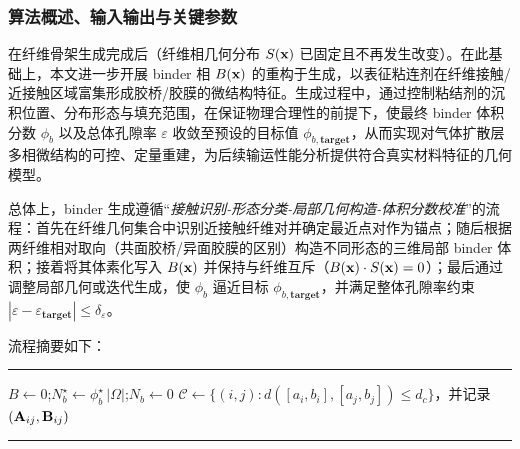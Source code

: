 \subsubsection{\textbf{算法概述、输入输出与关键参数}}

在纤维骨架生成完成后（纤维相几何分布 $S(\textbf x)$ 已固定且不再发生改变）。在此基础上，本文进一步开展 binder 相 $B(\textbf x)$ 的重构于生成，以表征粘连剂在纤维接触/近接触区域富集形成胶桥/胶膜的微结构特征。生成过程中，通过控制粘结剂的沉积位置、分布形态与填充范围，在保证物理合理性的前提下，使最终 binder 体积分数 $\phi_{b}$ 以及总体孔隙率 $\varepsilon$ 收敛至预设的目标值 $\phi_{b,\textbf{target}}$，从而实现对气体扩散层多相微结构的可控、定量重建，为后续输运性能分析提供符合真实材料特征的几何模型。

总体上，binder 生成遵循“\emph{接触识别-形态分类-局部几何构造-体积分数校准}”的流程：首先在纤维几何集合中识别近接触纤维对并确定最近点对作为锚点；随后根据两纤维相对取向（共面胶桥/异面胶膜的区别）构造不同形态的三维局部 binder 体积；接着将其体素化写入 $B(\textbf x)$ 并保持与纤维互斥（$B(\textbf x) \cdot S(\textbf x) = 0$）；最后通过调整局部几何或迭代生成，使 $\phi_{b}$ 逼近目标 $\phi_{b,\textbf{target}}$，并满足整体孔隙率约束 $|\varepsilon - \varepsilon_{\textbf{target}}| \le \delta_{\varepsilon}$。

\noindent\mbox{流程摘要如下：}
\begin{algorithm}[t]
\small
\DontPrintSemicolon
\SetAlgoVlined
{}

\BlankLine
\hrule
\BlankLine


$B \leftarrow 0$;\quad $N_b^{\star}\leftarrow \phi_b^{\star}\,|\Omega|$;\quad $N_b\leftarrow 0$\;
$\mathcal{C}\leftarrow \{(i,j): d([a_i,b_i],[a_j,b_j])\le d_c\}$，并记录 $(\textbf A_{ij},\textbf B_{ij})$\;


\;

\BlankLine
\hrule

\caption{基于纤维接触几何的 binder 生成流程}
\label{alg:binder}
\end{algorithm}

